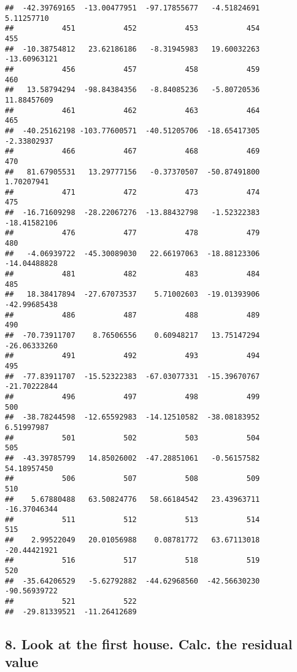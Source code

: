 \documentclass[
]{article}
\begin{document}
\begin{verbatim}
##  -42.39769165  -13.00477951  -97.17855677   -4.51824691    5.11257710 
##           451           452           453           454           455 
##  -10.38754812   23.62186186   -8.31945983   19.60032263  -13.60963121 
##           456           457           458           459           460 
##   13.58794294  -98.84384356   -8.84085236   -5.80720536   11.88457609 
##           461           462           463           464           465 
##  -40.25162198 -103.77600571  -40.51205706  -18.65417305   -2.33802937 
##           466           467           468           469           470 
##   81.67905531   13.29777156   -0.37370507  -50.87491800    1.70207941 
##           471           472           473           474           475 
##  -16.71609298  -28.22067276  -13.88432798   -1.52322383  -18.41582106 
##           476           477           478           479           480 
##   -4.06939722  -45.30089030   22.66197063  -18.88123306  -14.04488828 
##           481           482           483           484           485 
##   18.38417894  -27.67073537    5.71002603  -19.01393906  -42.99685438 
##           486           487           488           489           490 
##  -70.73911707    8.76506556    0.60948217   13.75147294  -26.06333260 
##           491           492           493           494           495 
##  -77.83911707  -15.52322383  -67.03077331  -15.39670767  -21.70222844 
##           496           497           498           499           500 
##  -38.78244598  -12.65592983  -14.12510582  -38.08183952    6.51997987 
##           501           502           503           504           505 
##  -43.39785799   14.85026002  -47.28851061   -0.56157582   54.18957450 
##           506           507           508           509           510 
##    5.67880488   63.50824776   58.66184542   23.43963711  -16.37046344 
##           511           512           513           514           515 
##    2.99522049   20.01056988    0.08781772   63.67113018  -20.44421921 
##           516           517           518           519           520 
##  -35.64206529   -5.62792882  -44.62968560  -42.56630230  -90.56939722 
##           521           522 
##  -29.81339521  -11.26412689
\end{verbatim}

\hypertarget{look-at-the-first-house.-calc.-the-residual-value}{%
\subsection{8. Look at the first house. Calc. the residual
value}\label{look-at-the-first-house.-calc.-the-residual-value}}
\end{document}
